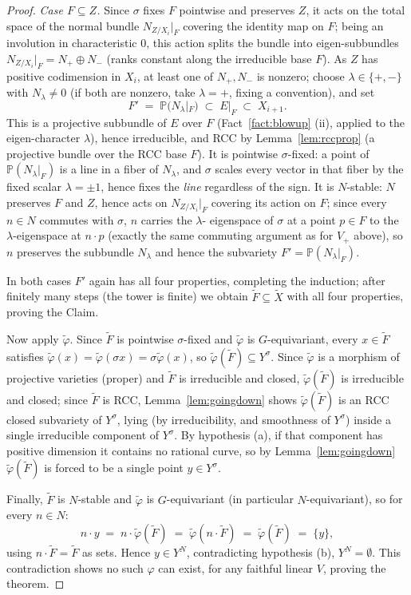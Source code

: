 \documentclass[11pt]{article}
\theoremstyle{plain}
\theoremstyle{definition}
\theoremstyle{remark}
\newcommand{\PP}{\mathbb P}
\begin{document}
\begin{proof}
\emph{Case $F\subseteq Z$.} Since $\sigma$ fixes $F$ pointwise and
preserves $Z$, it acts on the total space of the normal bundle
$N_{Z/X_i}|_F$ covering the identity map on $F$; being an involution in
characteristic $0$, this action splits the bundle into eigen-subbundles
$N_{Z/X_i}|_F = N_+\oplus N_-$ (ranks constant along the irreducible
base $F$). As $Z$ has positive codimension in $X_i$, at least one of
$N_+,N_-$ is nonzero; choose $\lambda\in\{+,-\}$ with $N_\lambda\ne 0$
(if both are nonzero, take $\lambda=+$, fixing a convention), and set
\[
F' \;=\; \PP(N_\lambda|_F) \;\subset\; E|_F \;\subset\; X_{i+1}.
\]
This is a projective subbundle of $E$ over $F$ (Fact~\ref{fact:blowup}
(ii), applied to the eigen-character $\lambda$), hence irreducible, and
RCC by Lemma~\ref{lem:rccprop} (a projective bundle over the RCC base
$F$). It is pointwise $\sigma$-fixed: a point of $\PP(N_\lambda|_F)$ is
a line in a fiber of $N_\lambda$, and $\sigma$ scales every vector in
that fiber by the fixed scalar $\lambda=\pm1$, hence fixes the
\emph{line} regardless of the sign. It is $N$-stable: $N$ preserves $F$
and $Z$, hence acts on $N_{Z/X_i}|_F$ covering its action on $F$; since
every $n\in N$ commutes with $\sigma$, $n$ carries the $\lambda$-
eigenspace of $\sigma$ at a point $p\in F$ to the $\lambda$-eigenspace
at $n\cdot p$ (exactly the same commuting argument as for $V_+$ above),
so $n$ preserves the subbundle $N_\lambda$ and hence the subvariety
$F'=\PP(N_\lambda|_F)$.

In both cases $F'$ again has all four properties, completing the
induction; after finitely many steps (the tower is finite) we obtain
$\widetilde F\subseteq\widetilde X$ with all four properties, proving
the Claim.

\smallskip
Now apply $\widetilde\varphi$. Since $\widetilde F$ is pointwise
$\sigma$-fixed and $\widetilde\varphi$ is $G$-equivariant, every $x\in
\widetilde F$ satisfies $\widetilde\varphi(x)=\widetilde\varphi(\sigma
x)=\sigma\widetilde\varphi(x)$, so $\widetilde\varphi(\widetilde F)
\subseteq Y^\sigma$. Since $\widetilde\varphi$ is a morphism of
projective varieties (proper) and $\widetilde F$ is irreducible and
closed, $\widetilde\varphi(\widetilde F)$ is irreducible and closed;
since $\widetilde F$ is RCC, Lemma~\ref{lem:goingdown} shows $\widetilde
\varphi(\widetilde F)$ is an RCC closed subvariety of $Y^\sigma$, lying
(by irreducibility, and smoothness of $Y^\sigma$) inside a single
irreducible component of $Y^\sigma$. By hypothesis (a), if that
component has positive dimension it contains no rational curve, so by
Lemma~\ref{lem:goingdown} $\widetilde\varphi(\widetilde F)$ is forced to
be a single point $y\in Y^\sigma$.

Finally, $\widetilde F$ is $N$-stable and $\widetilde\varphi$ is
$G$-equivariant (in particular $N$-equivariant), so for every $n\in N$:
\[
n\cdot y \;=\; n\cdot\widetilde\varphi(\widetilde F) \;=\;
\widetilde\varphi(n\cdot\widetilde F) \;=\; \widetilde\varphi
(\widetilde F) \;=\; \{y\},
\]
using $n\cdot\widetilde F=\widetilde F$ as sets. Hence $y\in Y^N$,
contradicting hypothesis (b), $Y^N=\emptyset$. This contradiction shows
no such $\varphi$ can exist, for any faithful linear $V$, proving the
theorem.
\end{proof}
\end{document}
